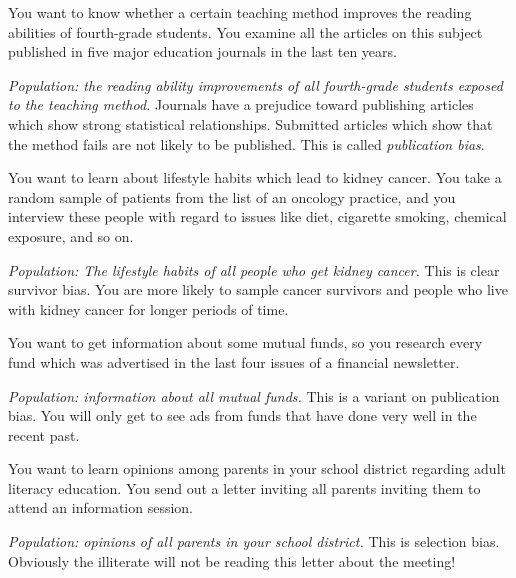 \documentclass[answers,11pt]{exam}
\begin{document}
\begin{questions}
 
 
 
 \question You want to know whether a certain teaching method improves the reading
 abilities of fourth-grade students.  You examine all the articles on this
 subject published in five major education journals in the last ten years.
 
 \begin{solution}
 \textit{Population: the reading ability improvements of all fourth-grade
 students exposed to the teaching method.}
 Journals have a prejudice toward publishing articles which show strong
 statistical relationships. Submitted articles which show that the method fails
 are not likely to be published. This is called \emph{publication bias}.
 \end{solution}
 
 
 
 
 \question You want to learn about lifestyle habits which lead to kidney cancer.   You
 take a random sample of patients from the list of an oncology practice, and
 you interview these people with regard to issues like diet, cigarette smoking,
 chemical exposure, and so on.
 
 \begin{solution}
 \textit{Population: The lifestyle habits of all people who get kidney cancer.}
 This is clear survivor bias.  You are more likely to sample cancer survivors
 and people who live with kidney cancer for longer periods of time.
 \end{solution}
 
 
 
 \question You want to get information about some mutual funds, so you research every
 fund which was advertised in the last four issues of a financial newsletter.
 
 \begin{solution}
 \textit{Population: information about all mutual funds.}
 This is a variant on publication bias. You will only get to see ads from
 funds that have done very well in the recent past.
 \end{solution}
 
 
 
 \question You want to learn opinions among parents in your school district regarding
 adult literacy education.  You send out a letter inviting all parents inviting
 them to attend an information session.
 
 \begin{solution}
 \textit{Population: opinions of all parents in your school district.}
 This is selection bias. Obviously the illiterate will not be reading this
 letter about the meeting!
 \end{solution}
 







\end{questions}
\end{document}
